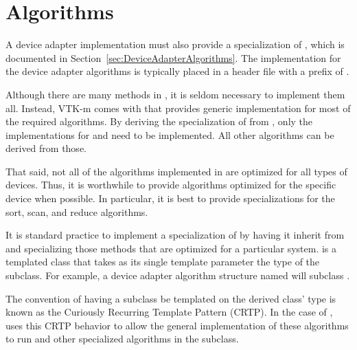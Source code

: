 

\section{Algorithms}


A device adapter implementation must also provide a specialization of
, which is documented in
Section~\ref{sec:DeviceAdapterAlgorithms}. The implementation for the
device adapter algorithms is typically placed in a header file with a
prefix of .

Although there are many methods in ,
it is seldom necessary to implement them all. Instead, VTK-m comes with
 that provides generic
implementation for most of the required algorithms. By deriving the
specialization of  from
, only the implementations
for  and  need to be implemented.
All other algorithms can be derived from those.

That said, not all of the algorithms implemented in
 are optimized for all types
of devices. Thus, it is worthwhile to provide algorithms optimized for the
specific device when possible. In particular, it is best to provide
specializations for the sort, scan, and reduce algorithms.

It is standard practice to implement a specialization of  by having it inherit from  and specializing those methods that are optimized for a particular system.
 is a templated class that takes as its single template parameter the type of the subclass.
For example, a device adapter algorithm structure named  will subclass .

\begin{didyouknow}
  The convention of having a subclass be templated on the derived class' type is known as the Curiously Recurring Template Pattern (CRTP).
  In the case of , \VTKm uses this CRTP behavior to allow the general implementation of these algorithms to run  and other specialized algorithms in the subclass.
\end{didyouknow}

